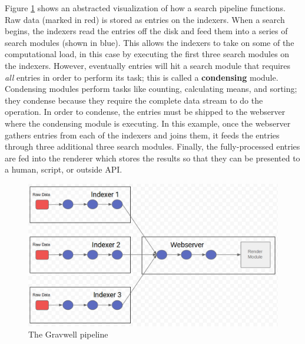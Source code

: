 Figure \ref{fig:pipeline} shows an abstracted visualization of how a search
pipeline functions. Raw data (marked in red) is stored as entries on the indexers. When a
search begins, the indexers read the entries off the disk and feed them
into a series of search modules (shown in blue). This allows the
indexers to take on some of the computational load, in this case by
executing the first three search modules on the indexers. However,
eventually entries will hit a search module that requires
\emph{all} entries in order to perform its task; this is called a
\textbf{condensing} module. Condensing modules perform tasks like counting,
calculating means, and sorting; they condense because they require the
complete data stream to do the operation. In order to condense, the
entries must be shipped to the webserver where the condensing module is
executing. In this example, once the webserver gathers entries from
each of the indexers and joins them, it feeds the entries through three
additional three search modules. Finally, the fully-processed entries
are fed into the renderer which stores the results so that they can be
presented to a human, script, or outside API.

\begin{figure}
	\includegraphics{images/pipeline.png}
	\caption{The Gravwell pipeline}
	\label{fig:pipeline}
\end{figure}




